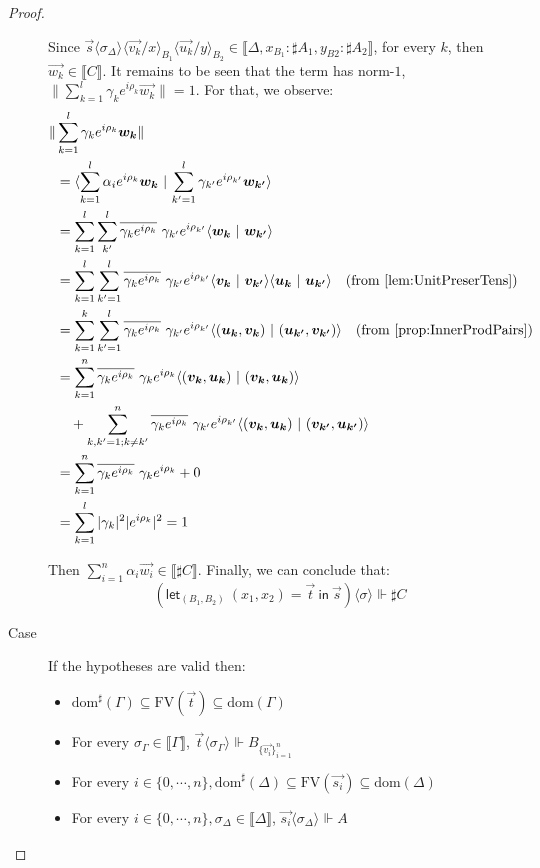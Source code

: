 \documentclass[runningheads,orivec]{llncs}
\newcommand\ansubst[2]{\ensuremath{\langle #1 \rangle_{#2}}}
\newcommand\dom[1]{\mathrm{dom}(#1)}
\newcommand\sdom[1]{\mathrm{dom}^{\sharp}(#1)}
\newcommand\FV[1]{\mathrm{FV}(#1)}
\def\scal#1#2{\langle{#1}~|~{#2}\rangle}
\def\Pair#1#2{(#1,#2)} %
\def\letkeyword{\mathsf{let}}
\def\inkeyword{\mathsf{in}}
\def\LetP#1#2#3#4#5#6{\letkeyword_{\Pair{#2}{#4}}~\Pair{#1}{#3}=#5~\inkeyword~#6}
\def\sem#1{\llbracket#1\rrbracket}
\def\real{\Vdash}
\newcommand\genbasis[3]{\ensuremath{B_{\{#1\}_{#2}^{#3}}}}
\begin{document}
\begin{proof}
\begin{description}
    Since $\vec{s}\ansubst{\sigma_\Delta}{}\ansubst{\vec{v_k}/x}{B_1}\ansubst{\vec{u_k}/y}{B_2}\in\sem{\Delta, x_{B_1}:\sharp A_1, y_{B2}:\sharp A_2}$, for every $k$, then $\vec{w_k}\in\sem{C}$. It remains to be seen that the term has norm-$1$, $\|\sum_{k=1}^{l}\gamma_k e^{i\rho_k} \vec{w_k}\|=1$. For that, we observe:
    \begin{align*}
        \|&\sum_{k=1}^{l}\gamma_k e^{i\rho_k} \vec{w_k}\| \\
        &= \scal{\sum_{k=1}^{l}\alpha_i e^{i\rho_k} \vec{w_k}}{\sum_{k'=1}^{l}\gamma_{k'} e^{i\rho_{k'}} \vec{w_{k'}}}\\
        &= \sum_{k=1}^{l}\sum_{k'}^{l}\overline{\gamma_k e^{i\rho_k}}\  \gamma_{k'} e^{i\rho_{k'}}\scal{\vec{w_k}}{\vec{w_{k'}}}\\
        &=\sum_{k=1}^{l}\sum_{k'=1}^{l}\overline{\gamma_k e^{i\rho_k}}\ \gamma_{k'} e^{i\rho_{k'}} \scal{\vec{v_k}}{\vec{v_{k'}}}\scal{\vec{u_k}}{\vec{u_{k'}}}\quad(\text{from \Cref{lem:UnitPreserTens}})\\
        &= \sum_{k=1}^{k}\sum_{k'=1}^{l}\overline{\gamma_k e^{i\rho_k}}\  \gamma_{k'} e^{i\rho_{k'}} \scal{\Pair{\vec{u_k}}{\vec{v_k}}}{\Pair{\vec{u_{k'}}}{\vec{v_{k'}}}}\quad(\text{from \Cref{prop:InnerProdPairs}})\\
        &=\sum_{k=1}^n \overline{\gamma_k e^{i\rho_k}}\ \gamma_k e^{i\rho_k} \scal{\Pair{\vec{v_k}}{\vec{u_k}}}{\Pair{\vec{v_k}}{\vec{u_k}}} \\
        & \quad + \sum_{k,k'=1; k\neq k'}^n \overline{\gamma_k e^{i\rho_k}}\  \gamma_{k'} e^{i\rho_{k'}} \scal{\Pair{\vec{v_k}}{\vec{u_k}}}{\Pair{\vec{v_{k'}}}{\vec{u_{k'}}}}\\
        &= \sum_{k=1}^n \overline{\gamma_k e^{i\rho_k}}\ \gamma_k e^{i\rho_k} + 0 \\
        &= \sum_{k=1}^{l} |\gamma_k|^2 |e^{i\rho_k}|^2 = 1
    \end{align*}

    Then $\sum_{i=1}^{n}\alpha_i\vec{w_i}\in\sem{\sharp C}$. Finally, we can conclude that: 
    \[(\LetP{x_1}{B_1}{x_2}{B_2}{\vec{t}}{\vec{s}})\ansubst{\sigma}{}\real{\sharp C}\]

    \item[Case] If the hypotheses are valid then:
    \begin{itemize}
        \item $\sdom{\Gamma}\subseteq \FV{\vec{t}}\subseteq \dom{\Gamma}$
        \item For every $\sigma_\Gamma\in\sem{\Gamma}$, $\vec{t}\ansubst{\sigma_\Gamma}{}\real\genbasis{\vec{v_i}}{i=1}{n}$
        \item For every $i\in\{0,\dotsb ,n\}, \sdom{\Delta}\subseteq \FV{\vec{s_i}}\subseteq \dom{\Delta}$
        \item For every $i\in\{0,\dotsb ,n\}, \sigma_\Delta\in\sem{\Delta}$, $\vec{s_i}\ansubst{\sigma_\Delta}{}\real A$
    \end{itemize}


\end{description}
\end{proof}
\end{document}
